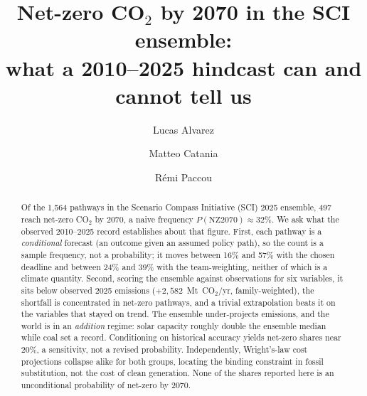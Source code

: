 \documentclass[sigconf, nonacm]{acmart}
\begin{document}
\title{Net-zero CO$_2$ by 2070 in the SCI ensemble:\\ what a 2010--2025 hindcast can and cannot tell us}

\author{Lucas Alvarez}

\author{Matteo Catania}

\author{R\'emi Paccou}

\begin{abstract}
Of the 1{,}564 pathways in the Scenario Compass Initiative (SCI) 2025 ensemble, 497 reach net-zero CO$_2$ by 2070, a naive frequency $P(\text{NZ2070})\approx 32\%$. We ask what the observed 2010--2025 record establishes about that figure. First, each pathway is a \emph{conditional} forecast (an outcome given an assumed policy path), so the count is a sample frequency, not a probability; it moves between 16\% and 57\% with the chosen deadline and between 24\% and 39\% with the team-weighting, neither of which is a climate quantity. Second, scoring the ensemble against observations for six variables, it sits below observed 2025 emissions ($+2{,}582$~Mt~CO$_2$/yr, family-weighted), the shortfall is concentrated in net-zero pathways, and a trivial extrapolation beats it on the variables that stayed on trend. The ensemble under-projects emissions, and the world is in an \emph{addition} regime: solar capacity roughly double the ensemble median while coal set a record. Conditioning on historical accuracy yields net-zero shares near 20\%, a sensitivity, not a revised probability. Independently, Wright's-law cost projections collapse alike for both groups, locating the binding constraint in fossil substitution, not the cost of clean generation. None of the shares reported here is an unconditional probability of net-zero by 2070.
\end{abstract}


\maketitle

\end{document}
